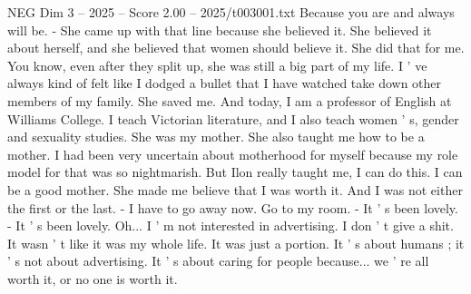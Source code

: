 \begin{textsample}{NEG Dim 3 – 2025 – Score 2.00 – 2025/t003001.txt}
Because you are and always will be. - She came up with that line because she believed it.
She believed it about herself, and she believed that women should believe it.
She did that for me.
You know, even after they split up, she was still a big part of my life.
I ' ve always kind of felt like I dodged a bullet that I have watched take down other members of my family.
She saved me.
And today, I am a professor of English at Williams College.
I teach Victorian literature, and I also teach women ' s, gender and sexuality studies.
She was my mother.
She also taught me how to be a mother.
I had been very uncertain about motherhood for myself because my role model for that was so nightmarish.
But Ilon really taught me, I can do this.
I can be a good mother.
She made me believe that I was worth it.
And I was not either the first or the last. - I have to go away now.
Go to my room. - It ' s been lovely. - It ' s been lovely.
Oh...
I ' m not interested in advertising.
I don ' t give a shit.
It wasn ' t like it was my whole life.
It was just a portion.
It ' s about humans ; it ' s not about advertising.
It ' s about caring for people because... we ' re all worth it, or no one is worth it.

\end{textsample}
